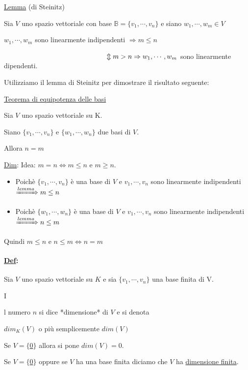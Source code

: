\documentclass{article}
\newcommand{\ul}[1]{\underline{#1}}
\newcommand{\B}{\mathbb{B}}
\newcommand{\Def}[2]{\paragraph{\ul{Def}:}#1\\\hspace*{3em}\begin{minipage}{.8\textwidth}#2\end{minipage}}
\begin{document}
\ul{Lemma} (di Steinitz)

Sia $V$ uno spazio vettoriale con base $\B=\{v_1,\cdots,v_n\}$ e siano $w_1,\cdots,w_m\in V$

$w_1,\cdots,w_m$ sono linearmente indipendenti $\Rightarrow m\le n$

$\hspace*{15em}\Updownarrow m>n\Rightarrow w_1,\cdots,w_m$ sono linearmente dipendenti.

Utilizziamo il lemma di Steinitz per dimostrare il risultato seguente:

\ul{Teorema di equipotenza delle basi}

Sia $V$ uno spazio vettoriale su K.

Siano $\{v_1,\cdots,v_n\}$ e $\{w_1,\cdots,w_n\}$ due basi di $V$.

Allora $n=m$

\ul{Dim}: Idea: $m=n\Leftrightarrow m\le n$ e $m\ge n$.
\begin{itemize}
	\item Poichè $\{v_1,\cdots,v_n\}$ è una base di $V$ e $v_1,\cdots,v_n$ sono linearmente indipendenti $\xRightarrow{lemma}m\le n$
	\item Poichè $\{w_1,\cdots,w_n\}$ è una base di $V$ e $v_1,\cdots,v_n$ sono linearmente indipendenti $\xRightarrow{lemma}n\le m$
\end{itemize}

Quindi $m\le n$ e $n\le m\Leftrightarrow n=m$

\Def{Sia $V$ uno spazio vettoriale su $K$ e sia $\{v_1,\cdots,v_n\}$ una base finita di V.}

Il numero $n$ si dice *dimensione* di $V$ e si denota

$dim_K(V)$ o più semplicemente $dim(V)$

Se $V=\{$\ul{0}$\}$ allora si pone $dim(V)=0$.

Se $V=\{$\ul{0}$\}$ oppure se $V$ ha una base finita diciamo che $V$ ha \ul{dimensione finita}.
\end{document}
